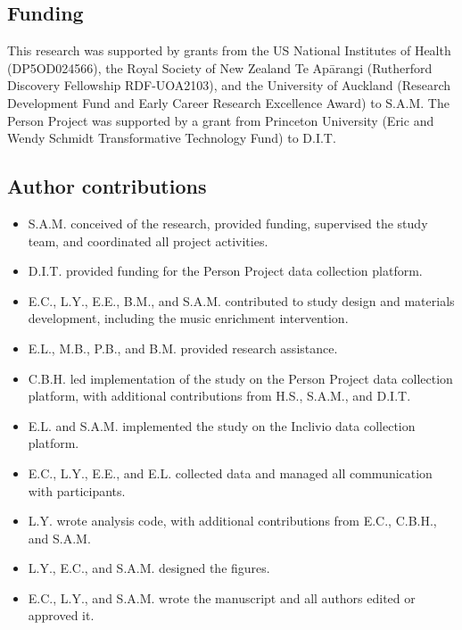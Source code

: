 \documentclass[
]{article}
\providecommand{\tightlist}{%
  \setlength{\itemsep}{0pt}\setlength{\parskip}{0pt}}
\begin{document}
\subsection*{Funding}\label{funding}

This research was supported by grants from the US National Institutes of
Health (DP5OD024566), the Royal Society of New Zealand Te Apārangi
(Rutherford Discovery Fellowship RDF-UOA2103), and the University of
Auckland (Research Development Fund and Early Career Research Excellence
Award) to S.A.M. The Person Project was supported by a grant from
Princeton University (Eric and Wendy Schmidt Transformative Technology
Fund) to D.I.T.

\subsection*{Author contributions}\label{author-contributions}

\begin{itemize}
\tightlist
\item
  S.A.M. conceived of the research, provided funding, supervised the
  study team, and coordinated all project activities.
\item
  D.I.T. provided funding for the Person Project data collection
  platform.
\item
  E.C., L.Y., E.E., B.M., and S.A.M. contributed to study design and
  materials development, including the music enrichment intervention.
\item
  E.L., M.B., P.B., and B.M. provided research assistance.
\item
  C.B.H. led implementation of the study on the Person Project data
  collection platform, with additional contributions from H.S., S.A.M.,
  and D.I.T.
\item
  E.L. and S.A.M. implemented the study on the Inclivio data collection
  platform.
\item
  E.C., L.Y., E.E., and E.L. collected data and managed all
  communication with participants.
\item
  L.Y. wrote analysis code, with additional contributions from E.C.,
  C.B.H., and S.A.M.
\item
  L.Y., E.C., and S.A.M. designed the figures.
\item
  E.C., L.Y., and S.A.M. wrote the manuscript and all authors edited or
  approved it.
\end{itemize}
\end{document}
